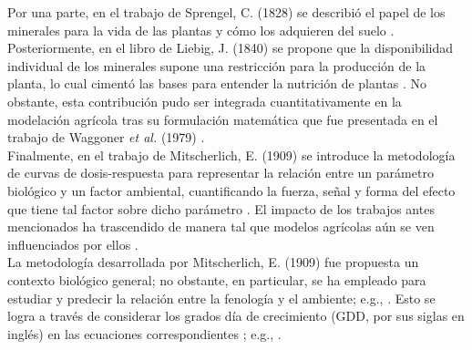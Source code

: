 Por una parte, en el trabajo de Sprengel, C. (1828) \cite{Sprengel_1828} se describió el papel de los minerales para la vida de las plantas y cómo los adquieren del suelo \cite{Jungk_2009}. Posteriormente, en el libro de Liebig, J. (1840) \cite{Liebig_1840} se propone que la disponibilidad individual de los minerales supone una restricción para la producción de la planta, lo cual cimentó las bases para entender la nutrición de plantas \cite{Sinclair_1993}. No obstante, esta contribución pudo ser integrada cuantitativamente en la modelación agrícola tras su formulación matemática que fue presentada en el trabajo de Waggoner \textit{et al.} (1979) \cite{Waggoner_1979}.\\


Finalmente, en el trabajo de Mitscherlich, E. (1909) \cite{Mitscherlich_1909} se introduce la metodología de curvas de dosis-respuesta para representar la relación entre un parámetro biológico y un factor ambiental, cuantificando la fuerza, señal y forma del efecto que tiene tal factor sobre dicho parámetro \cite{Poorter_2011}. El impacto de los trabajos antes mencionados ha trascendido de manera tal que modelos agrícolas aún se ven influenciados por ellos \cite{STEHFEST_2007}.\\





La metodología desarrollada por Mitscherlich, E. (1909) \cite{Mitscherlich_1909} fue propuesta un contexto biológico general; no obstante, en particular, se ha empleado para estudiar y predecir la relación entre la fenología y el ambiente; e.g., \cite{CAMPILLAYLLANOS_2024, Rafique_2024, Verdugo-Vasquez_2017}. Esto se logra a través de considerar los grados día de crecimiento (GDD, por sus siglas en inglés) en las ecuaciones correspondientes \cite{Rafique_2024}; e.g., \cite{CAMPILLAYLLANOS_2024,France_1984, Thornley_1990, Verdugo-Vasquez_2017}.\\ 

